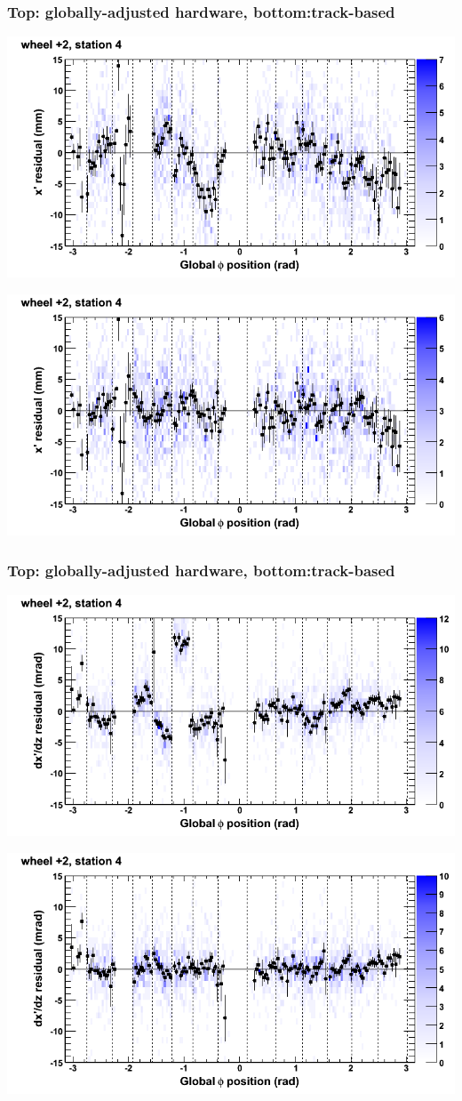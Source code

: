\documentclass[compress]{beamer}
\begin{document}
\begin{frame}
\frametitle{Top: globally-adjusted hardware, bottom:track-based}
\includegraphics[width=0.7\linewidth]{NOV4_mapplots_HW/DTvsphi_st4whE_x.png}

\includegraphics[width=0.7\linewidth]{NOV4_mapplots/DTvsphi_st4whE_x.png}
\end{frame}

\begin{frame}
\frametitle{Top: globally-adjusted hardware, bottom:track-based}
\includegraphics[width=0.7\linewidth]{NOV4_mapplots_HW/DTvsphi_st4whE_dxdz.png}

\includegraphics[width=0.7\linewidth]{NOV4_mapplots/DTvsphi_st4whE_dxdz.png}
\end{frame}
\end{document}
